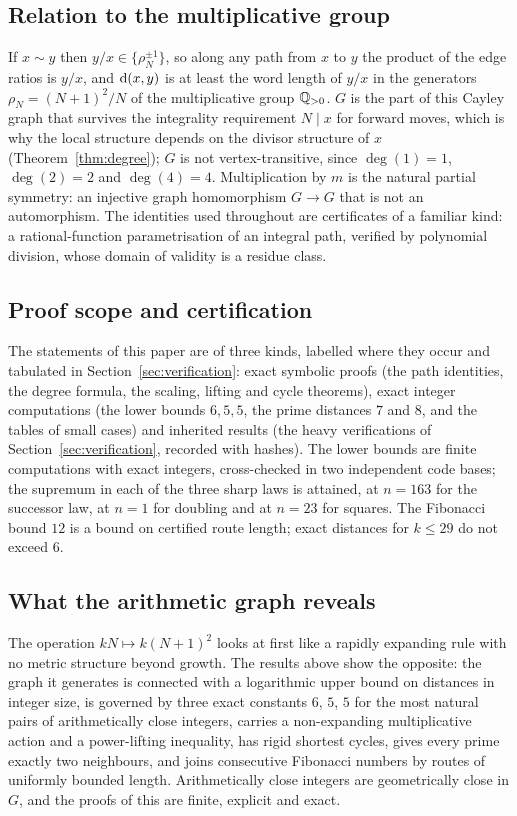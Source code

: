 \subsection{Relation to the multiplicative group}
If $x\sim y$ then $y/x\in\{\rho_N^{\pm1}\}$, so along any path from $x$ to $y$ the product of the edge ratios is $y/x$, and $\operatorname{d}(x,y)$ is at least the word length of $y/x$ in the generators $\rho_N=(N+1)^2/N$ of the multiplicative group $\mathbb{Q}_{>0}$. $G$ is the part of this Cayley graph that survives the integrality requirement $N\mid x$ for forward moves, which is why the local structure depends on the divisor structure of $x$ (Theorem~\ref{thm:degree}); $G$ is not vertex-transitive, since $\deg(1)=1$, $\deg(2)=2$ and $\deg(4)=4$. Multiplication by $m$ is the natural partial symmetry: an injective graph homomorphism $G\to G$ that is not an automorphism.
The identities used throughout are certificates of a familiar kind: a rational-function parametrisation of an integral path, verified by polynomial division, whose domain of validity is a residue class.

\subsection{Proof scope and certification}
The statements of this paper are of three kinds, labelled where they occur and tabulated in Section~\ref{sec:verification}: exact symbolic proofs (the path identities, the degree formula, the scaling, lifting and cycle theorems), exact integer computations (the lower bounds $6,5,5$, the prime distances $7$ and $8$, and the tables of small cases) and inherited results (the heavy verifications of Section~\ref{sec:verification}, recorded with hashes). The lower bounds are finite computations with exact integers, cross-checked in two independent code bases; the supremum in each of the three sharp laws is attained, at $n=163$ for the successor law, at $n=1$ for doubling and at $n=23$ for squares. The Fibonacci bound $12$ is a bound on certified route length; exact distances for $k\le29$ do not exceed $6$.

\subsection{What the arithmetic graph reveals}
The operation $kN\mapsto k(N+1)^2$ looks at first like a rapidly expanding rule with no metric structure beyond growth. The results above show the opposite: the graph it generates is connected with a logarithmic upper bound on distances in integer size, is governed by three exact constants $6$, $5$, $5$ for the most natural pairs of arithmetically close integers, carries a non-expanding multiplicative action and a power-lifting inequality, has rigid shortest cycles, gives every prime exactly two neighbours, and joins consecutive Fibonacci numbers by routes of uniformly bounded length. Arithmetically close integers are geometrically close in $G$, and the proofs of this are finite, explicit and exact.

